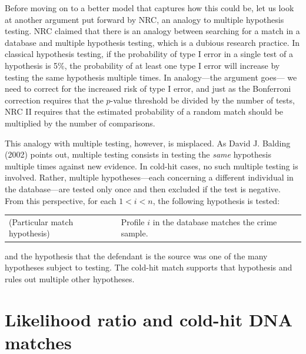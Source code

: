 \documentclass[
  10pt,
  dvipsnames,enabledeprecatedfontcommands]{scrartcl}
\begin{document}
Before moving on to a better model that captures how this could be, let
us look at another argument put forward by NRC, an analogy to multiple
hypothesis testing. NRC claimed that there is an analogy between
searching for a match in a database and multiple hypothesis testing,
which is a dubious research practice. In classical hypothesis testing,
if the probability of type I error in a single test of a hypothesis is
5\%, the probability of at least one type I error will increase by
testing the same hypothesis multiple times. In analogy---the argument
goes--- we need to correct for the increased risk of type I error, and
just as the Bonferroni correction requires that the \(p\)-value
threshold be divided by the number of tests, NRC II requires that the
estimated probability of a random match should be multiplied by the
number of comparisons.

This analogy with multiple testing, however, is misplaced. As David J.
Balding (2002) points out, multiple testing consists in testing the
\textit{same} hypothesis multiple times against new evidence. In
cold-hit cases, no such multiple testing is involved. Rather, multiple
hypotheses---each concerning a different individual in the
database---are tested only once and then excluded if the test is
negative. From this perspective, for each \(1 < i <n\), the following
hypothesis is tested: \vspace{1mm}

\begin{tabular}{lp{8cm}}
(Particular match hypothesis) &
Profile $i$ in the database matches the crime sample.
\end{tabular}
\vspace{1mm}

\noindent and the hypothesis that the defendant is the source was one of
the many hypotheses subject to testing. The cold-hit match supports that
hypothesis and rules out multiple other hypotheses.

\section{ Likelihood ratio and cold-hit DNA matches \label{sec:cold-hit}}
\end{document}
